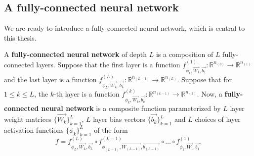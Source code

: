 \subsection{A fully-connected neural network}
We are ready to introduce a fully-connected neural network, which is central to this thesis.
\begin{definition}
\label{defn:nn}
A \textbf{fully-connected neural network} of depth $L$ is a composition of $L$ fully-connected layers. Suppose that the first layer is a function $f_{\phi_1, \vec{W_1}, \vec{b_1}}^{(1)} : \mathbb{R}^{n_{(0)}} \to \mathbb{R}^{n_{(1)}}$ and the last layer is a function $f_{\phi_L, \vec{W_L}, \vec{b_L}}^{(L)} : \mathbb{R}^{n_{(L-1)}} \to \mathbb{R}^{n_{(L)}}$. Suppose that for $1 \leq k \leq L$, the $k$-th layer is a function $f_{\phi_k, \vec{W_k}, \vec{b_k}}^{(k)} : \mathbb{R}^{n_{(k-1)}} \to \mathbb{R}^{n_{(k)}}$. Now, a \textbf{fully-connected neural network} is a composite function parameterized by $L$ layer weight matrices $\{ \vec{W_k}  \}_{k=1}^{L}$, $L$ layer bias vectors $\{ \vec{b_k} \}_{k=1}^{L}$ and $L$ choices of layer activation functions $\{ \phi_{k} \}_{k=1}^{L}$ of the form
\begin{equation*}
    f = f_{\phi_L, \vec{W_L}, \vec{b_L}}^{(L)} \circ  f_{\phi_{(L-1)}, \vec{W_{(L-1)}}, \vec{b_{(L-1)}}}^{(L - 1)} \circ \ldots \circ f_{\phi_1, \vec{W_1}, \vec{b_1}}^{(1)}.
\end{equation*}
\end{definition}
